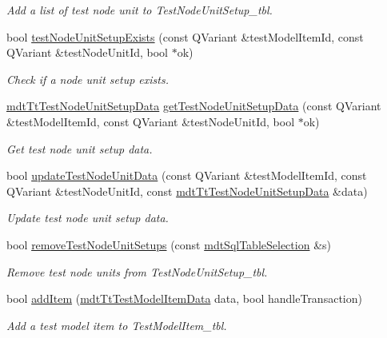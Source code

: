 \begin{DoxyCompactItemize}
\begin{DoxyCompactList}\small\item\em Add a list of test node unit to Test\-Node\-Unit\-Setup\-\_\-tbl. \end{DoxyCompactList}\item 
bool \hyperlink{classmdt_tt_test_model_item_aaab456933a7b5996002243cd7debe5d8}{test\-Node\-Unit\-Setup\-Exists} (const Q\-Variant \&test\-Model\-Item\-Id, const Q\-Variant \&test\-Node\-Unit\-Id, bool $\ast$ok)
\begin{DoxyCompactList}\small\item\em Check if a node unit setup exists. \end{DoxyCompactList}\item 
\hyperlink{classmdt_tt_test_node_unit_setup_data}{mdt\-Tt\-Test\-Node\-Unit\-Setup\-Data} \hyperlink{classmdt_tt_test_model_item_a70aa4e3eccb99d87a6d7f3774cce5ceb}{get\-Test\-Node\-Unit\-Setup\-Data} (const Q\-Variant \&test\-Model\-Item\-Id, const Q\-Variant \&test\-Node\-Unit\-Id, bool $\ast$ok)
\begin{DoxyCompactList}\small\item\em Get test node unit setup data. \end{DoxyCompactList}\item 
bool \hyperlink{classmdt_tt_test_model_item_a28996ba0b74dc51cebd1e1581cee4500}{update\-Test\-Node\-Unit\-Data} (const Q\-Variant \&test\-Model\-Item\-Id, const Q\-Variant \&test\-Node\-Unit\-Id, const \hyperlink{classmdt_tt_test_node_unit_setup_data}{mdt\-Tt\-Test\-Node\-Unit\-Setup\-Data} \&data)
\begin{DoxyCompactList}\small\item\em Update test node unit setup data. \end{DoxyCompactList}\item 
bool \hyperlink{classmdt_tt_test_model_item_a20d8f2715f35d5ce8c1fba6179e73a52}{remove\-Test\-Node\-Unit\-Setups} (const \hyperlink{classmdt_sql_table_selection}{mdt\-Sql\-Table\-Selection} \&s)
\begin{DoxyCompactList}\small\item\em Remove test node units from Test\-Node\-Unit\-Setup\-\_\-tbl. \end{DoxyCompactList}\item 
bool \hyperlink{classmdt_tt_test_model_item_a9468138aaa95944661765f3dfed563b0}{add\-Item} (\hyperlink{classmdt_tt_test_model_item_data}{mdt\-Tt\-Test\-Model\-Item\-Data} data, bool handle\-Transaction)
\begin{DoxyCompactList}\small\item\em Add a test model item to Test\-Model\-Item\-\_\-tbl. \end{DoxyCompactList}\item 

\end{DoxyCompactItemize}
